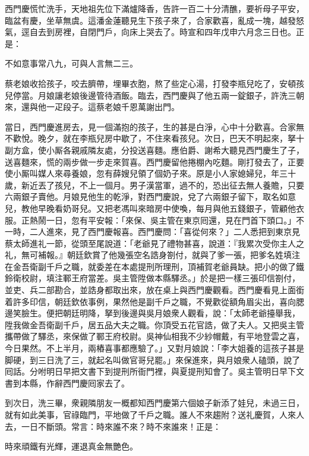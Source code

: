 西門慶慌忙洗手，天地祖先位下滿爐降香，告許一百二十分清醮，要祈母子平安，臨盆有慶，坐草無虞。{}這潘金蓮聽見生下孩子來了，合家歡喜，亂成一塊，越發怒氣，逕自去到房裡，自閉門戶，向床上哭去了。{}時宣和四年戊申六月念三日也。正是：

不如意事常八九，可與人言無二三。

蔡老娘收拾孩子，咬去臍帶，埋畢衣胞，熬了些定心湯，打發李瓶兒吃了，安頓孩兒停當。月娘讓老娘後邊管待酒飯。臨去，西門慶與了他五兩一錠銀子，許洗三朝來，還與他一疋段子。這蔡老娘千恩萬謝出門。

當日，西門慶進房去，見一個滿抱的孩子，生的甚是白淨，心中十分歡喜。合家無不歡悅。晚夕，就在李瓶兒房中歇了，不住來看孩兒。次日，巴天不明起來，拏十副方盒，使小厮各親戚隣友處，分投送喜麵。應伯爵、謝希大聽見西門慶生了子，送喜麵來，慌的兩步做一步走來賀喜。西門慶留他捲棚內吃麵。剛打發去了，正要使小厮叫媒人來尋養娘，忽有薛嫂兒領了個奶子來。原是小人家媳婦兒，年三十歲，新近丟了孩兒，不上一個月。男子漢當軍，過不的，恐出征去無人養贍，只要六兩銀子賣他。月娘見他生的乾淨，{}對西門慶說，兌了六兩銀子留下，取名如意兒，教他早晚看奶哥兒。又把老馮叫來暗房中使喚，每月與他五錢銀子，管顧他衣服。正熱鬧一日，忽有平安報：「來保、吳主管在東京囘還，見在門首下頭口。」不一時，二人進來，見了西門慶報喜。西門慶問：「喜從何來？」二人悉把到東京見蔡太師進礼一節，從頭至尾說道：「老爺見了禮物甚喜，說道：『我累次受你主人之礼，無可補報。』朝廷欽賞了他幾張空名誥身劄付，就與了爹一張，把爹名姓填注在金吾衛副千戶之職，就委差在本處提刑所理刑，頂補賀老爺員缺。把小的做了鐵鈴衛校尉，填注鄆王府當差。吳主管陞做本縣驛丞。」於是把一樣三張印信劄付，並吏、兵二部勘合，並誥身都取出來，放在桌上與西門慶觀看。西門慶看見上面銜着許多印信，朝廷欽依事例，果然他是副千戶之職，不覺歡從額角眉尖出，喜向腮邊笑臉生。便把朝廷明降，拏到後邊與吳月娘衆人觀看，說：「太師老爺擡舉我，陞我做金吾衛副千戶，居五品大夫之職。你頂受五花官誥，做了夫人。又把吳主管攜帶做了驛丞，來保做了鄆王府校尉。吳神仙相我不少紗帽戴，有平地登雲之喜，今日果然。不上半月，兩樁喜事都應驗了。」又對月娘說：「李大姐養的這孩子甚是脚硬，到三日洗了三，就起名叫做官哥兒罷。」來保進來，與月娘衆人磕頭，說了囘話。分咐明日早把文書下到提刑所衙門裡，與夏提刑知會了。吳主管明日早下文書到本縣，作辭西門慶囘家去了。

到次日，洗三畢，衆親隣朋友一概都知西門慶第六個娘子新添了娃兒，未過三日，就有如此美事，官祿臨門，平地做了千戶之職。誰人不來趨附？送礼慶賀，人來人去，一日不斷頭。常言：時來誰不來？時不來誰來！正是：

時來頑鐵有光輝，運退真金無艷色。

